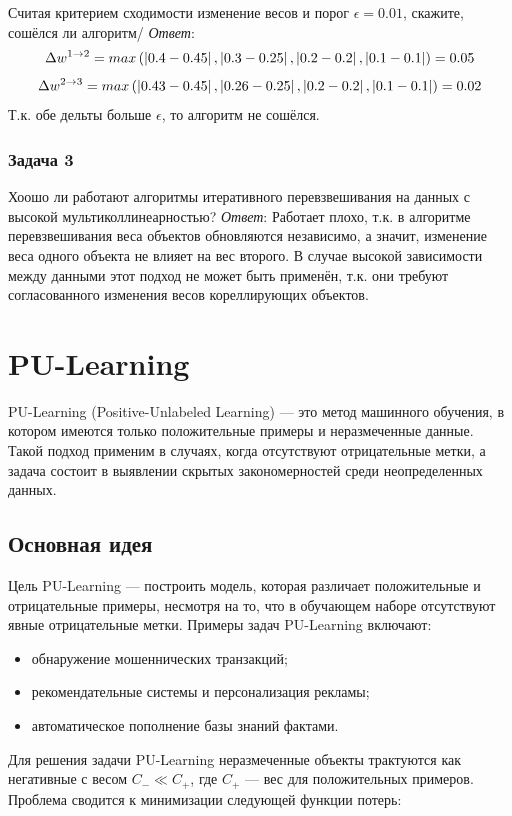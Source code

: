 Считая критерием сходимости изменение весов и порог \(\epsilon = 0.01\),
скажите, сошёлся ли алгоритм/
\textit{Ответ}:
\[ \Delta w^{1\rightarrow2} = max\left( \left|0.4-0.45\right|, \left|0.3 - 0.25\right|, \left|0.2-0.2\right|, \left|0.1-0.1\right|  \right) = 0.05 \]
\[ \Delta w^{2\rightarrow3} = max\left( \left|0.43-0.45\right|, \left|0.26 - 0.25\right|, \left|0.2-0.2\right|, \left|0.1-0.1\right|  \right) = 0.02 \]
Т.к. обе дельты больше \(\epsilon\), то алгоритм не сошёлся.

\subsubsection{Задача 3}
Хоошо ли работают алгоритмы итеративного перевзвешивания на данных с высокой
мультиколлинеарностью?
\textit{Ответ}: Работает плохо, т.к. в алгоритме перевзвешивания веса объектов
обновляются независимо, а значит, изменение веса одного объекта не влияет на
вес второго. В случае высокой зависимости между данными этот подход не может
быть применён, т.к. они требуют согласованного изменения весов кореллирующих
объектов.

\section{PU-Learning}

PU-Learning (Positive-Unlabeled Learning) — это метод машинного обучения, в котором имеются только положительные примеры и неразмеченные данные. Такой подход применим в случаях, когда отсутствуют отрицательные метки, а задача состоит в выявлении скрытых закономерностей среди неопределенных данных.

\subsection{Основная идея}

Цель PU-Learning — построить модель, которая различает положительные и отрицательные примеры, несмотря на то, что в обучающем наборе отсутствуют явные отрицательные метки. Примеры задач PU-Learning включают:

\begin{itemize}
    \item обнаружение мошеннических транзакций;
    \item рекомендательные системы и персонализация рекламы;
    \item автоматическое пополнение базы знаний фактами.
\end{itemize}

Для решения задачи PU-Learning неразмеченные объекты трактуются как негативные с весом \( C_- \ll C_+ \), где \( C_+ \) — вес для положительных примеров. Проблема сводится к минимизации следующей функции потерь:

